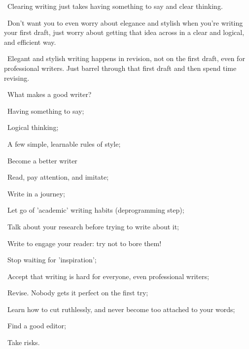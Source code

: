 \documentclass[a4paper, 12pt]{article}
\begin{document}
\vspace{4pt}\par\textbullet\ Clearing writing just takes having something to say and clear thinking.

\vspace{4pt}\par\textbullet\ Don't want you to even worry about elegance and stylish when you're writing your first draft, just worry about getting that idea across in a clear and logical, and efficient way.

\vspace{4pt}\par\textbullet\ Elegant and stylish writing happens in revision, not on the first draft, even for professional writers. Just barrel through that first draft and then spend time revising.

\vspace{4pt}\par\textbullet\ What makes a good writer?
\par\quad\textopenbullet\ Having something to say;
\par\quad\textopenbullet\ Logical thinking;
\par\quad\textopenbullet\ A few simple, learnable rules of style;

\vspace{4pt}\par\textbullet\ Become a better writer
\par\quad\textopenbullet\ Read, pay attention, and imitate;
\par\quad\textopenbullet\ Write in a journey;
\par\quad\textopenbullet\ Let go of 'academic' writing habits (deprogramming step);
\par\quad\textopenbullet\ Talk about your research before trying to write about it;
\par\quad\textopenbullet\ Write to engage your reader: try not to bore them!
\par\quad\textopenbullet\ Stop waiting for 'inspiration';
\par\quad\textopenbullet\ Accept that writing is hard for everyone, even professional writers;
\par\quad\textopenbullet\ Revise. Nobody gets it perfect on the first try;
\par\quad\textopenbullet\ Learn how to cut ruthlessly, and never become too attached to your words;
\par\quad\textopenbullet\ Find a good editor;
\par\quad\textopenbullet\ Take risks.
\end{document}
